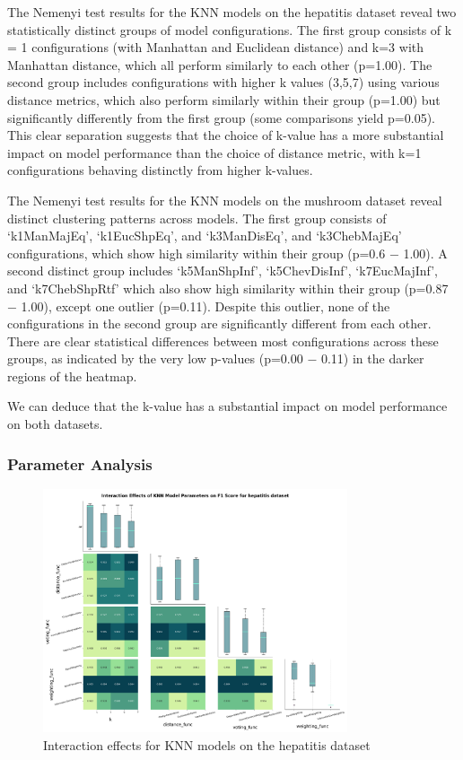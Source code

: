 The Nemenyi test results for the KNN models on the hepatitis dataset reveal two statistically distinct
groups of model configurations. The first group consists of k = 1 configurations
(with Manhattan and Euclidean distance) and k=3 with Manhattan distance, which all perform similarly to each other (p=1.00).
The second group includes configurations with higher k values (3,5,7) using various distance metrics,
which also perform similarly within their group (p=1.00) but significantly differently from the first
group (some comparisons yield p=0.05). This clear separation suggests that the choice of k-value
has a more substantial impact on model performance than the choice of distance metric, with k=1 configurations behaving distinctly from higher k-values.

The Nemenyi test results for the KNN models on the mushroom dataset reveal distinct clustering patterns across models.
The first group consists of `k1ManMajEq', `k1EucShpEq', and `k3ManDisEq', and `k3ChebMajEq' configurations, which show
high similarity within their group (p=0.6 $-$ 1.00). A second distinct group includes `k5ManShpInf', `k5ChevDisInf',
`k7EucMajInf', and `k7ChebShpRtf' which also show high similarity within their group (p=0.87 $-$ 1.00), except 
one outlier (p=0.11). Despite this outlier, none of the configurations in the second group are significantly different from each other.
There are clear statistical differences between most configurations across these groups,
as indicated by the very low p-values (p=0.00 $-$ 0.11) in the darker regions of the heatmap.

We can deduce that the k-value has a substantial impact on model performance on both datasets. 

\subsubsection*{Parameter Analysis}

\begin{figure}[!ht]
    \centering
    \includegraphics[width=0.8\textwidth]{figures/interaction_effects_KNN_hepatitis.png}
    \caption{Interaction effects for KNN models on the hepatitis dataset}
\label{fig:interaction_effects_KNN_hepatitis}
\end{figure}

